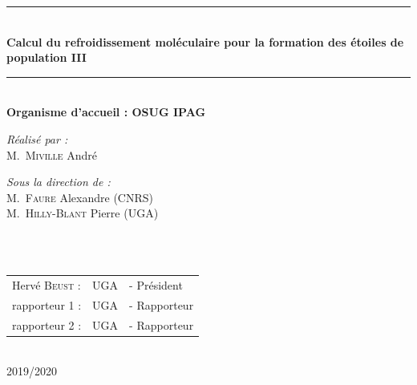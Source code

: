 \documentclass[10pt, a4paper]{report}
\numberwithin{equation}{subsection}
\begin{document}
\begin{titlepage}
\begin{center}
\rule{\linewidth}{0.3mm} \\[0.4cm]
{ \huge \bfseries\color{blue!70!black} Calcul du refroidissement moléculaire pour la formation des étoiles de population III \\[0.4cm] }
\rule{\linewidth}{0.3mm} \\[1cm]
{\large \bfseries Organisme d'accueil : OSUG IPAG}\\[1cm]
\noindent
\begin{minipage}{0.4\textwidth}
  \begin{flushleft} \large
    \emph{\color{orange!80!black}Réalisé par :}\\
    M.~\textsc{Miville} André\\
  \end{flushleft}
\end{minipage}%
\begin{minipage}{0.5\textwidth}
  \begin{flushright} \large
    \emph{\color{orange!80!black}Sous la direction de :} \\
    M.~\textsc{Faure} Alexandre (CNRS)\\
    M.~\textsc{Hilly-Blant} Pierre (UGA)\\
  \end{flushright}
\end{minipage}\\[1cm]

\\[0.5cm]

\color{black}
\centering
\begin{tabular}{lll}
\large Hervé \textsc{Beust} : & \large UGA & \large - Président \\[0.1cm]
\large rapporteur 1 \textsc{} : & \large UGA & \large - Rapporteur \\[0.1cm]
\large rapporteur 2\textsc{} : & \large UGA & \large - Rapporteur
\end{tabular}

\vfill

{\large \color{orange!80!black}{Année universitaire}\\ \color{blue!80!black}2019/2020}

\end{center}
\end{titlepage}
\end{document}
